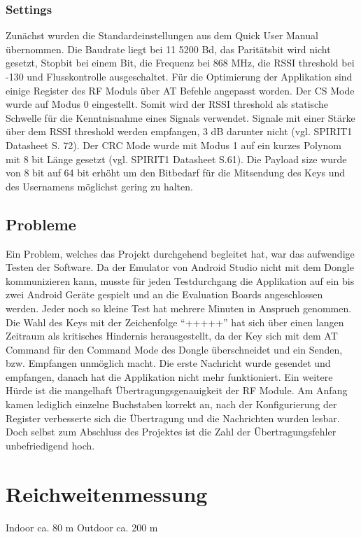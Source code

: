 \documentclass[a4paper, 12.5pt]{scrartcl}
\begin{document}
\subsubsection{Settings}

Zunächst wurden die Standardeinstellungen aus dem Quick User Manual übernommen. Die Baudrate liegt bei 11 5200 Bd, das Paritätsbit wird nicht gesetzt, Stopbit bei einem Bit, die Frequenz bei 868 MHz, die RSSI threshold bei -130 und Flusskontrolle ausgeschaltet. Für die Optimierung der Applikation sind einige Register des RF Moduls über AT Befehle angepasst worden. Der CS Mode wurde auf Modus 0 eingestellt. Somit wird der RSSI threshold als statische Schwelle für die Kenntnisnahme eines Signals verwendet. Signale mit einer Stärke über dem RSSI threshold werden empfangen, 3 dB darunter nicht (vgl. SPIRIT1 Datasheet S. 72). Der CRC Mode wurde mit Modus 1 auf ein kurzes Polynom mit 8 bit Länge gesetzt (vgl. SPIRIT1 Datasheet S.61). Die Payload size wurde von 8 bit auf 64 bit erhöht um den Bitbedarf für die Mitsendung des Keys und des Usernamens möglichst gering zu halten.

\subsection{Probleme}

Ein Problem, welches das Projekt durchgehend begleitet hat, war das aufwendige Testen der Software. Da der Emulator von Android Studio nicht mit dem Dongle kommunizieren kann, musste für jeden Testdurchgang die Applikation auf ein bis zwei Android Geräte gespielt und an die Evaluation Boards angeschlossen werden. Jeder noch so kleine Test hat mehrere Minuten in Anspruch genommen.
Die Wahl des Keys mit der Zeichenfolge “+++++” hat sich über einen langen Zeitraum als kritisches Hindernis herausgestellt, da der Key sich mit dem AT Command für den Command Mode des Dongle überschneidet und ein Senden, bzw. Empfangen unmöglich macht. Die erste Nachricht wurde gesendet und empfangen, danach hat die Applikation nicht mehr funktioniert. 
Ein weitere Hürde ist die mangelhaft Übertragungsgenauigkeit der RF Module. Am Anfang kamen lediglich einzelne Buchstaben korrekt an, nach der Konfigurierung der Register verbesserte sich die Übertragung und die Nachrichten wurden lesbar. Doch selbst zum Abschluss des Projektes ist die Zahl der Übertragungsfehler unbefriedigend hoch.


\section{Reichweitenmessung}
Indoor ca. 80 m
\newline
Outdoor ca. 200 m
\end{document}
